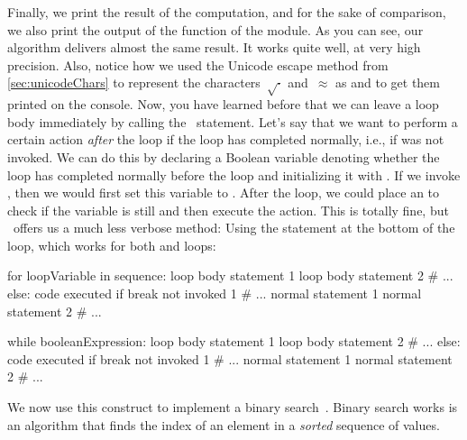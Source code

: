 Finally, we print the result of the computation, and for the sake of comparison, we also print the output of the  function of the  module.
As you can see, our algorithm delivers almost the same result.
It works quite well, at very high precision.
Also, notice how we used the Unicode escape method from \cref{sec:unicodeChars} to represent the characters~$\sqrt{\cdot}$ and~$\approx$ as  and  to get them printed on the console.%
%
\FloatBarrier%
\endhsection%
%
%
%
\label{sec:loopElse}%
%
Now, you have learned before that we can leave a loop body immediately by calling the~ statement.
Let's say that we want to perform a certain action \emph{after} the loop if the loop has completed normally, i.e., if  was not invoked.
We can do this by declaring a Boolean variable denoting whether the loop has completed normally before the loop and initializing it with .
If we invoke , then we would first set this variable to .
After the loop, we could place an  to check if the variable is still  and then execute the action.
This is totally fine, but \python\ offers us a much less verbose method:
Using the  statement at the bottom of the loop, which works for both  and  loops:%
%
\begin{pythonSyntax}
for loopVariable in sequence:
    loop body statement 1
    loop body statement 2
    # ...
else:
    code executed if break not invoked 1
    # ...
normal statement 1
normal statement 2
# ...
\end{pythonSyntax}
%
\begin{pythonSyntax}
while booleanExpression:
    loop body statement 1
    loop body statement 2
    # ...
else:
    code executed if break not invoked 1
    # ...
normal statement 1
normal statement 2
# ...
\end{pythonSyntax}
%
%
%
We now use this construct to implement a binary search~\cite{K1998SAS,H2024POIC:BS,B1999PP}.
Binary search works is an algorithm that finds the index of an element in a \emph{sorted} sequence  of values.
